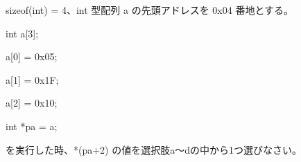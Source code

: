 sizeof(int) = 4、int 型配列 a の先頭アドレスを 0x04 番地とする。\par
\noindent int a[3]; \par
\noindent a[0] = 0x05; \par
\noindent a[1] = 0x1F; \par
\noindent a[2] = 0x10; \par
\noindent int *pa = a; \par
を実行した時、*(pa+2) の値を選択肢a〜dの中から1つ選びなさい。
